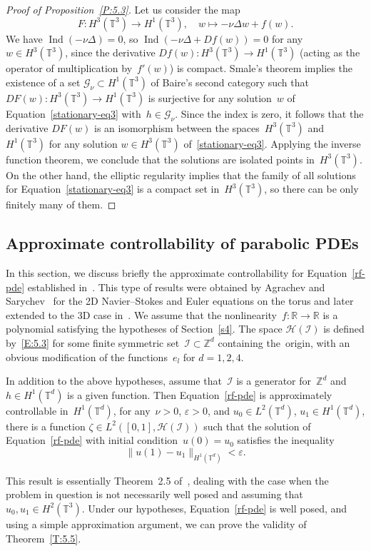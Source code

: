 \documentclass[JEP,XML,SOM,Unicode,ThmDefs]{cedram}
\let\mathcal\mathscr
\theoremstyle{plain}
\numberwithin{equation}{section}
\let\e\varepsilon
\newcommand{\R}{{\mathbb R}}
\newcommand{\Z}{{\mathbb Z}}
\newcommand{\T}{{\mathbb T}}
\DeclareMathOperator{\Ind}{Ind}
\newcommand{\GG}{{\mathcal G}}
\newcommand{\HH}{{\mathcal H}}
\newcommand{\II}{{\mathcal I}}
\begin{document}
\begin{proof}[Proof of Proposition~\ref{P:5.3}]
Let us consider the map
\[
F:H^3(\T^3)\to H^1(\T^3), \quad w\mapsto -\nu\Delta w+f(w).
\]
We have $\Ind(-\nu \Delta)=0$, so $\Ind(-\nu \Delta+Df(w))=0$ for any~$w\in H^3(\T^3)$, since the derivative $Df(w):H^3(\T^3)\to H^1(\T^3)$ (acting as the operator of multiplication by~$f'(w)$) is compact. Smale's theorem implies the existence of a set $\GG_\nu\subset H^1(\T^3)$ of Baire's second category such that $DF(w):H^3(\T^3)\to H^1(\T^3)$ is surjective for any solution~$w$ of Equation~\eqref{stationary-eq3} with~$h\in \GG_\nu$. Since the index is zero, it follows that the derivative $DF(w)$ is an isomorphism between the spaces~$H^3(\T^3)$ and~$H^1(\T^3)$ for any solution $w\in H^3(\T^3)$ of~\eqref{stationary-eq3}. Applying the inverse function theorem, we conclude that the solutions are isolated points in~$H^3(\T^3)$. On the other hand, the elliptic regularity implies that the family of all solutions for Equation~\eqref{stationary-eq3} is a compact set in~$H^3(\T^3)$, so there can be only finitely many of them.
\end{proof}

\subsection{Approximate controllability of parabolic PDEs}\label{S:5.4}
In this section, we discuss briefly the approximate controllability for Equation~\eqref{rf-pde} established in~\cite{nersesyan-2020}. This type of results were obtained by Agrachev and Sarychev~\cite{AS-2005, AS-2006} for the 2D Navier--Stokes and Euler equations on the torus and later extended to the 3D case in~\cite{shirikyan-cmp2006,nersisyan-2010}. We assume that the nonlinearity~$f:\R\to \R$ is a polynomial satisfying the hypotheses of Section~\ref{s4}. The space $\HH(\II)$ is defined by~\eqref{E:5.3} for some finite symmetric set~$\II\subset\Z^d$ containing the~origin, with an obvious modification of the functions~$e_l$ for $d=1,2, 4$.

\begin{theorem}\label{T:5.5}
In addition to the above hypotheses, assume that~$\II$ is a generator for~$\Z^d$ and~$h\in H^1(\T^d)$ is a given function. Then Equation~\eqref{rf-pde} is approximately controllable in~$H^1(\T^d)$, \ie for any~$\nu>0$, $\e>0$, and $u_0\in L^2(\T^d)$, $u_1\in H^1(\T^d)$, there is a function $\zeta\in L^2([0,1], \HH(\II))$ such that the solution of Equation~\eqref{rf-pde} with initial condition~$u(0)=u_0$ satisfies the inequality
\[
\|u(1) - u_1 \|_{H^1(\T^d)}<\e.
\]
\end{theorem}

This result is essentially Theorem~2.5 of~\cite{nersesyan-2020}, dealing with the case when the problem in question is not necessarily well posed and assuming that $u_0,u_1\in H^2(\T^3)$. Under our hypotheses, Equation~\eqref{rf-pde} is well posed, and using a simple approximation argument, we can prove the validity of Theorem~\ref{T:5.5}.

\backmatter


\end{document}
